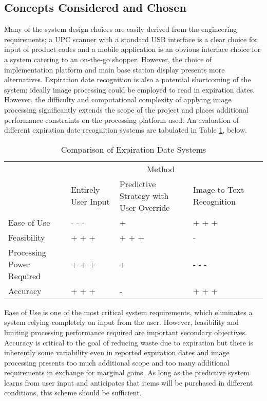 \documentclass[11pt,letterpaper]{article}
\begin{document}
\subsection{Concepts Considered and Chosen}
Many of the system design choices are easily derived from the engineering requirements; a UPC scanner with a standard USB interface is a clear choice for input of product codes and a mobile application is an obvious interface choice for a system catering to an on-the-go shopper. However, the choice of implementation platform and main base station display presents more alternatives. Expiration date recognition is also a potential shortcoming of the system; ideally image processing could be employed to read in expiration dates. However, the difficulty and computational complexity of applying image processing significantly extends the scope of the project and places additional performance constraints on the processing platform used. An evaluation of different expiration date recognition systems are tabulated in Table \ref{tab:datesys}, below.
\begin{table}[h!]
\begin{tabular}{| p{2in} | p{1in} | p{1.5in} | p{1.5in} | p{1.5in} |}
\cline{2-4}
\multicolumn{1}{c}{}&\multicolumn{3}{|c|}{Method} \\
\cline{2-4}
\multicolumn{1}{c|}{}&Entirely User Input&Predictive Strategy with User Override & Image to Text Recognition\\
\hline
Ease of Use&- - -&+&+ + +\\
\hline
Feasibility&+ + +&+ + +&-\\
\hline
Processing Power Required & + + + & + & - - -\\
\hline
Accuracy & + + + & - & + + +\\
\hline
\end{tabular}
\caption{Comparison of Expiration Date Systems}
\label{tab:datesys}
\end{table}
Ease of Use is one of the most critical system requirements, which eliminates a system relying completely on input from the user. However, feasibility and limiting processing performance required are important secondary objectives. Accuracy is critical to the goal of reducing waste due to expiration but there is inherently some variability even in reported expiration dates and image processing presents too much additional scope and too many additional requirements in exchange for marginal gains. As long as the predictive system learns from user input and anticipates that items will be purchased in different conditions, this scheme should be sufficient.
\end{document}
